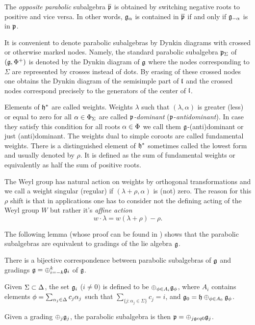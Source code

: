 The \emph{opposite parabolic} subalgebra $\overline{\mathfrak{p}}$  is obtained by switching negative roots to positive and vice versa. In other words, $\mathfrak{g}_\alpha$ is contained in $\overline{\mathfrak{p}}$ if and only if $\mathfrak{g}_{-\alpha}$ is in $\mathfrak{p}$.

It is convenient to denote parabolic subalgebras by Dynkin diagrams with crossed or otherwise marked nodes. Namely, the standard parabolic subalgebra $\mathfrak{p}_\Sigma$ of $(\mathfrak{g},\Phi^+)$ is denoted by the Dynkin diagram of $\mathfrak{g}$ where the nodes corresponding to $\Sigma$ are represented by crosses instead of dots. By erasing of these crossed nodes one obtains the Dynkin diagram of the semisimple part of $\mathfrak{l}$ and the crossed nodes correspond precisely to the generators of the center of $\mathfrak{l}$.


Elements of $\mathfrak{h}^*$ are called weights. Weights $\lambda$ such that $(\lambda, \alpha)$ is greater (less) or equal to zero for all $\alpha \in \Phi_\Sigma$ are called \emph{$\mathfrak{p}$-dominant} ($\mathfrak{p}$-\emph{antidominant}). In case they satisfy this condition for all roots $\alpha \in \Phi$ we call them $\mathfrak{g}$-(anti)dominant or just (anti)dominant. The weights dual to simple coroots are called fundamental weights. There is a distinguished element of $\mathfrak{h}^*$ sometimes called the lowest form and usually denoted by $\rho$. It is defined as the sum of fundamental weights or equivalently as half the sum of positive roots. 

The Weyl group has natural action on weights by orthogonal transformations and we call a weight singular (regular) if $(\lambda + \rho, \alpha)$ is (not) zero. The reason for this $\rho$ shift is that in applications one has to consider not the defining acting of the Weyl group $W$ but rather it's \emph{affine action} 
\[
 w \cdot \lambda = w(\lambda + \rho) - \rho.
\]

The following lemma (whose proof can be found in \cite{cap_parabolic_2009}) shows that the parabolic subalgebras are equivalent to gradings of the lie algebra $\mathfrak{g}$.
\begin{lemma}
There is a bijective correspondence between parabolic subalgebras of $\mathfrak{g}$ and gradings $\mathfrak{g}=\oplus_{i=-k}^k \mathfrak{g}_i$ of $\mathfrak{g}$.

	Given $\Sigma\subset\Delta$, the set $\mathfrak{g}_i$ ($i\neq 0)$ is defined to be $\oplus_{\phi\in A_i} \mathfrak{g}_\phi$, where $A_i$ contains elements $\phi=\sum_{\alpha_j\in\Delta} c_j \alpha_j$ such that $\sum_{\{j:\alpha_j\in\Sigma\}} c_j=i$, and $\mathfrak{g}_0=\mathfrak{h}\oplus_{\phi\in A_0} \mathfrak{g}_\phi$.

	Given a grading $\oplus_j \mathfrak{g}_j$, the parabolic subalgebra is then $\mathfrak{p}=\oplus_{j\mathfrak{g}eq 0}\mathfrak{g}_j$.
\end{lemma}

